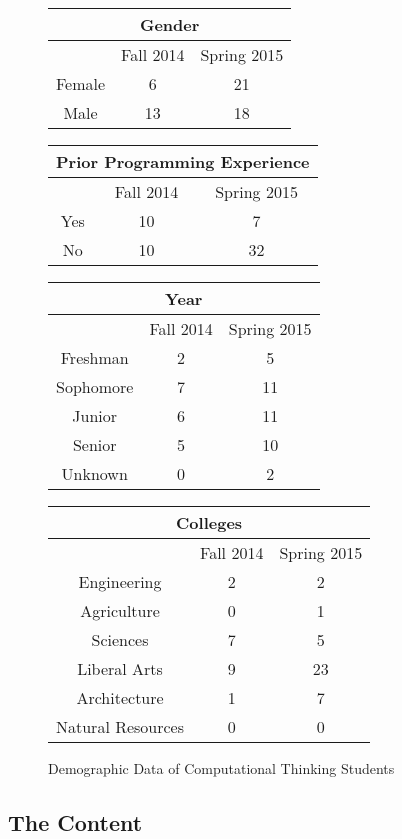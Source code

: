 \begin{figure*}
\begin{minipage}{\linewidth}
\centering
	\begin{tabular}{c|c|c}
	  \multicolumn{3}{c}{Gender}\\\hline
		& Fall 2014 & Spring 2015 \\\hline
		Female & 6 & 21 \\
		Male & 13 & 18 \\
	\end{tabular}
\centering
	\begin{tabular}{c|c|c}
	  \multicolumn{3}{c}{Prior Programming Experience}\\\hline
		& Fall 2014 & Spring 2015 \\\hline
		Yes & 10 & 7 \\
		No & 10 & 32 \\
	\end{tabular}
\centering
	\begin{tabular}{c|c|c}
		\multicolumn{3}{c}{Year}\\\hline
		& Fall 2014 & Spring 2015 \\\hline
		Freshman & 2 & 5 \\
		Sophomore & 7 & 11 \\
		Junior & 6 & 11 \\
		Senior & 5 & 10 \\
		Unknown & 0 & 2 \\
	\end{tabular}
\centering	
	\begin{tabular}{c|c|c}
	  \multicolumn{3}{c}{Colleges}\\\hline
		& Fall 2014 & Spring 2015 \\\hline
		Engineering & 2 & 2 \\
		Agriculture & 0 & 1 \\
		Sciences & 7 & 5 \\
		Liberal Arts & 9 & 23 \\
		Architecture & 1 & 7 \\
		Natural Resources & 0 & 0 \\
	\end{tabular}
\caption{Demographic Data of Computational Thinking Students}
\label{data-demographics}
\end{minipage}
\end{figure*}


\subsection{The Content}

